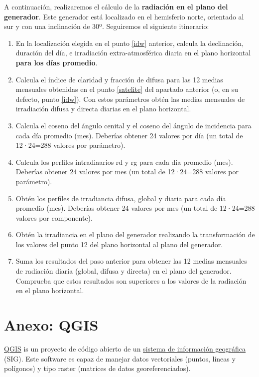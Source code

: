 \documentclass[11pt]{article}
\begin{document}
A continuación, realizaremos el cálculo de la \textbf{radiación en el plano del generador}. Este generador está localizado en el hemisferio norte, orientado al sur y con una inclinación de 30º. Seguiremos el siguiente itinerario:

\begin{enumerate}
\item En la localización elegida en el punto \ref{idw} anterior, calcula la declinación, duración del día, e irradiación extra-atmosférica diaria en el plano horizontal \textbf{para los días promedio}.
\item Calcula el índice de claridad y fracción de difusa para las 12 medias mensuales obtenidas en el punto \ref{satelite} del apartado anterior (o, en su defecto, punto \ref{idw}). Con estos parámetros obtén las medias mensuales de irradiación difusa y directa diarias en el plano horizontal.
\item Calcula el coseno del ángulo cenital y el coseno del ángulo de incidencia para cada día promedio (mes). Deberías obtener 24 valores por día (un total de 12·24=288 valores por parámetro).
\item Calcula los perfiles intradiaarios rd y rg para cada dia promedio (mes). Deberías obtener 24 valores por mes (un total de 12·24=288 valores por parámetro).
\item Obtén los perfiles de irradiancia difusa, global y diaria para cada día promedio (mes). Deberías obtener 24 valores por mes (un total de 12·24=288 valores por componente).
\item Obtén la irradiancia en el plano del generador realizando la transformación de los valores del punto 12 del plano horizontal al plano del generador.
\item Suma los resultados del paso anterior para obtener las 12 medias mensuales de radiación diaria (global, difusa y directa) en el plano del generador. Comprueba que estos resultados son superiores a los valores de la radiación en el plano horizontal.
\end{enumerate}

\clearpage

\section{Anexo: QGIS}
\label{sec:qgis}

\href{https://qgis.org/es/site/}{QGIS} is un proyecto de código abierto de un \href{https://es.wikipedia.org/wiki/Sistema\_de\_informaci\%C3\%B3n\_geogr\%C3\%A1fica}{sistema de información
geográfica} (SIG). Este software es capaz de manejar datos
vectoriales (puntos, líneas y polígonos) y tipo raster (matrices de
datos georeferenciados).
\end{document}
